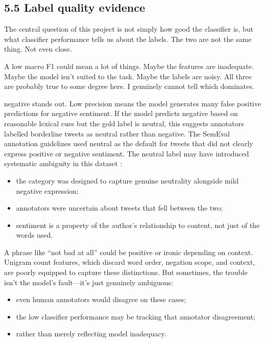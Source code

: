 \documentclass[12pt]{article}
\begin{document}
\subsection*{5.5 Label quality evidence}



The central question of this project is not simply how good the classifier is, but what classifier performance tells us about the labels. The two are not the same thing. Not even close.

A low macro F1 could mean a lot of things. Maybe the features are inadequate. Maybe the model isn't suited to the task. Maybe the labels are noisy. All three are probably true to some degree here. I genuinely cannot tell which dominates.

negative stands out. Low precision means the model generates many false positive predictions for negative sentiment. If the model predicts negative based on reasonable lexical cues but the gold label is neutral, this suggests annotators labelled borderline tweets as neutral rather than negative. The SemEval annotation guidelines used neutral as the default for tweets that did not clearly express positive or negative sentiment. The neutral label may have introduced systematic ambiguity in this dataset \citep{kenyondean2018sentiment}:

\begin{itemize}

  \item the category was designed to capture genuine neutrality alongside mild negative expression;

  \item annotators were uncertain about tweets that fell between the two;

  \item sentiment is a property of the author's relationship to content, not just of the words used.

\end{itemize}

A phrase like ``not bad at all'' could be positive or ironic depending on context. Unigram count features, which discard word order, negation scope, and context, are poorly equipped to capture these distinctions. But sometimes, the trouble isn't the model's fault---it's just genuinely ambiguous:

\begin{itemize}

  \item even human annotators would disagree on these cases;

  \item the low classifier performance may be tracking that annotator disagreement;

  \item rather than merely reflecting model inadequacy.

\end{itemize}
\end{document}
